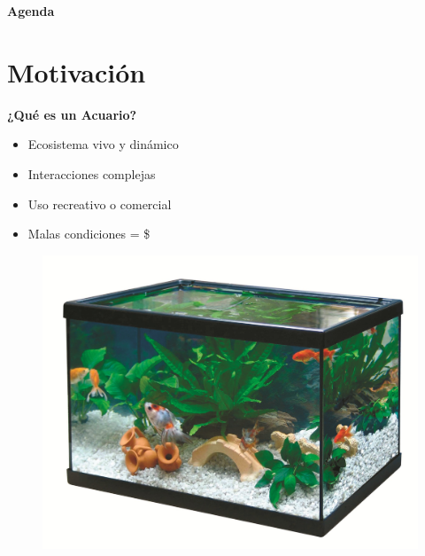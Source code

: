 \documentclass[11pt]{beamer}
\begin{document}
\begin{frame}{\textbf{\LARGE{Agenda}}}
\fontsize{18pt}{18}\selectfont
\tableofcontents
\end{frame}

\section{Motivación}

\begin{frame}{\textbf{\LARGE{¿Qué es un Acuario?}}}
\fontsize{18pt}{18}\selectfont
\begin{minipage}[c]{1.0\linewidth}
\begin{minipage}[c]{0.68\linewidth}
	\begin{itemize}
		\item Ecosistema vivo y dinámico 
		\vspace{12px}
		\item Interacciones complejas
		\vspace{12px}
		\item Uso recreativo o comercial
		\vspace{12px}
		\item Malas condiciones = \$
	\end{itemize}	
  \end{minipage}
  \hspace{-40px}
  \begin{minipage}[l]{0.30\linewidth}
	\begin{figure}[H]
		\includegraphics[width=1.7\textwidth]{./imagenes/acuario.jpg}
	\end{figure}	  	  	
  \end{minipage}
\end{minipage}
\end{frame}
\end{document}
